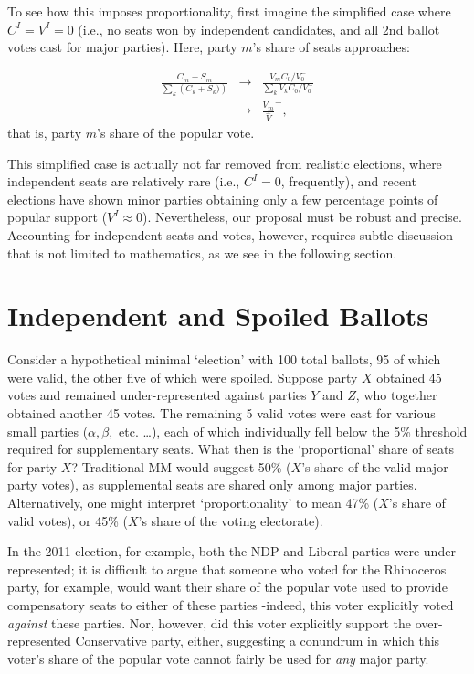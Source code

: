To see how this imposes proportionality, first imagine the simplified case where $C^I=V^I=0$ (i.e., no seats won by independent candidates, and all 2nd ballot votes cast for major parties). Here, party $m$'s share of seats approaches:

\begin{align}
\label{eq:seatshare}
\frac{C_m+S_m}{ \sum\limits_k\left( C_k+S_k) \right)} &\to& \frac{V_m C_0/V_0^-}{ \sum\limits_k V_k C_0/V_0^-} \\
&\to& \frac{V_m}{\hat{V}}^-,
\end{align}
that is, party $m$'s share of the popular vote. 

This simplified case is actually not far removed from realistic elections, where independent seats are relatively rare (i.e., $C^I=0$, frequently), and recent elections have shown minor parties obtaining only a few percentage points of popular support ($V^I \approx 0$). 
Nevertheless, our proposal must be robust and precise. Accounting for independent seats and votes, however, requires subtle discussion that is not limited to mathematics, as we see in the following section. 


\section{Independent and Spoiled Ballots}
\label{sec:outliers}
Consider a hypothetical minimal `election' with 100 total ballots, 95 of which were valid, the other five of which were spoiled. Suppose party $X$ obtained 45 votes and remained under-represented against parties $Y$ and $Z$, who together obtained another 45 votes. The remaining 5 valid votes were cast for various small parties ($\alpha,\beta,$ etc. \ldots), each of which individually fell below the 5\% threshold required for supplementary seats.
What then is the `proportional' share of seats for party $X$?
Traditional MM would suggest 50\% ($X$'s share of the valid major-party votes), as supplemental seats are shared only among major parties. Alternatively, one might interpret `proportionality' to mean 47\% ($X$'s share of valid votes), or 45\% ($X$'s share of the voting electorate). 


In the 2011 election, for example, both the NDP and Liberal parties were under-represented; it is difficult to argue that someone who voted for the Rhinoceros party, for example, would want their share of the popular vote used to provide compensatory seats to either of these parties \--indeed, this voter explicitly voted \emph{against} these parties. 
Nor, however, did this voter explicitly support the over-represented Conservative party, either, suggesting a conundrum in which this voter's share of the popular vote cannot fairly be used for \emph{any} major party. 

